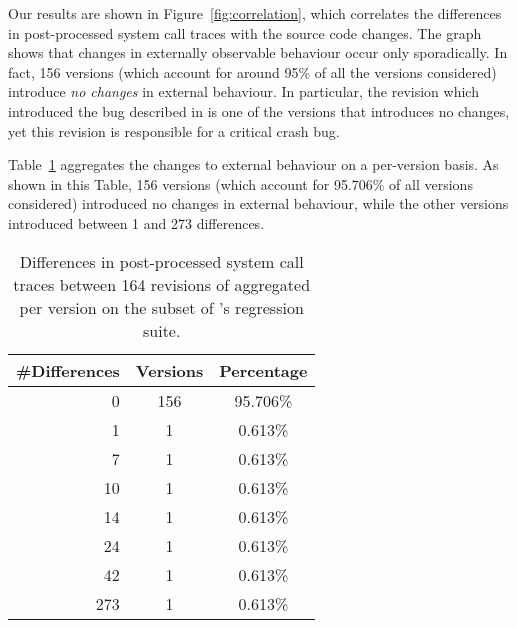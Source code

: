 Our results are shown in Figure~\ref{fig:correlation}, which
correlates the differences in post-processed system call traces with
the source code changes.  The graph shows that changes in externally
observable behaviour occur only sporadically.  In fact, 156 versions
(which account for around 95\% of all the versions considered)
introduce \textit{no changes} in external behaviour.  In particular,
the revision which introduced the bug described in 
is one of the versions that introduces no changes, yet this revision
is responsible for a critical crash bug.




Table~\ref{tab:perversion} aggregates the changes to external behaviour
on a per-version basis.  As shown in this Table, 156 versions (which
account for 95.706\% of all versions considered) introduced no changes
in external behaviour, while the other versions introduced between 1
and 273 differences. 

\begin{table}
  \centering
  \begin{tabular}{r @{\qquad}c c}
    \hline
    \#Differences & Versions & Percentage \\
    \hline
    0 & 156 & 95.706\% \\
    1 & 1 & 0.613\% \\
    7 & 1 & 0.613\% \\
    10 & 1 & 0.613\% \\ 
    14 & 1 & 0.613\% \\
    24 & 1 & 0.613\% \\
    42 & 1 & 0.613\% \\
    273 & 1 & 0.613\% \\
    \hline
  \end{tabular}
  \caption{Differences in post-processed system call traces between 164
  revisions of \lighttpd aggregated per version on the subset of \lighttpd's
  regression suite.}
  \label{tab:perversion}
\end{table}
